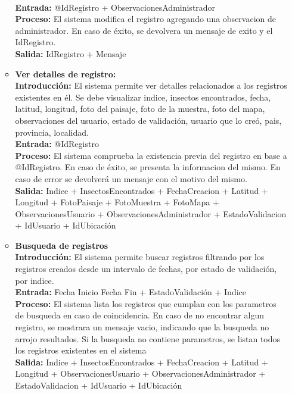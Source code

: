 \begin{enumerate}[A.]
\begin{itemize}
            \\ \textbf{Entrada:} @IdRegistro + ObservacionesAdministrador
            \\ \textbf{Proceso:} El sistema modifica el registro agregando una observacion de administrador. En caso de éxito, se devolvera un mensaje de exito y el IdRegistro.
            \\ \textbf{Salida:} IdRegistro + Mensaje
            \\
          \item \textbf{Ver detalles de registro:}
            \\ \textbf{Introducción:} El sistema permite ver detalles relacionados a los registros existentes en él. Se debe visualizar indice, insectos encontrados, fecha, latitud, longitud, foto del paisaje, foto de la muestra, foto del mapa, observaciones del usuario, estado de validación, usuario que lo creó, pais, provincia, localidad.
            \\ \textbf{Entrada:} @IdRegistro
            \\ \textbf{Proceso:} El sistema comprueba la existencia previa del registro en base a @IdRegistro. En caso de éxito, se presenta la informacion del mismo. En caso de error se devolverá un mensaje con el motivo del mismo.
            \\ \textbf{Salida:} Indice + InsectosEncontrados + FechaCreacion + Latitud + Longitud + FotoPaisaje + FotoMuestra + FotoMapa + ObservacionesUsuario + ObservacionesAdministrador + EstadoValidacion + IdUsuario + IdUbicación
            \\
          \item \textbf{Busqueda de registros}
            \\ \textbf{Introducción:} El sistema permite buscar registros filtrando por los registros creados desde un intervalo de fechas, por estado de validación, por indice.
            \\ \textbf{Entrada:} Fecha Inicio Fecha Fin + EstadoValidación + Indice
            \\ \textbf{Proceso:} El sistema lista los registros que cumplan con los parametros de busqueda en caso de coincidencia. En caso de no encontrar algun registro, se mostrara un mensaje vacio, indicando que la busqueda no arrojo resultados. Si la busqueda no contiene parametros, se listan todos los registros existentes en el sistema
            \\ \textbf{Salida:} Indice + InsectosEncontrados + FechaCreacion + Latitud + Longitud + ObservacionesUsuario + ObservacionesAdministrador + EstadoValidacion + IdUsuario + IdUbicación
        \end{itemize}


\end{enumerate}
